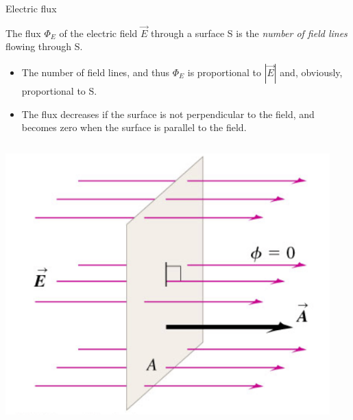 \begin{frame}{Electric flux}

The flux $\Phi_E$ of the electric field $\vec{E}$ through a surface S is the {\em number of field lines}
flowing through S.
\begin{itemize}
 \item
   The number of field lines, and thus $\Phi_E$ is proportional to $|\vec{E}|$ and, obviously, proportional to S.
 \item
   The flux decreases if the surface is not perpendicular to the field, and becomes zero when the surface
   is parallel to the field.
\end{itemize}

\begin{columns}
  \begin{column}{0.33\textwidth}
   \begin{center}
    \includegraphics[width=0.98\textwidth]{./images/schematics/electric_flux_surface_perpendicular.png}\\
   \end{center}
  \end{column}
  \begin{column}{0.33\textwidth}
   \begin{center}

\end{center}
\end{column}
\end{columns}
\end{frame}
